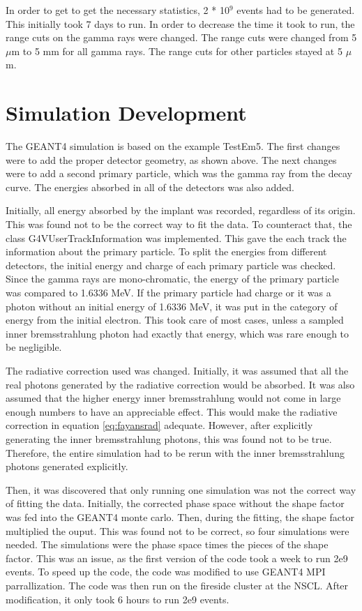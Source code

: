\documentclass[../main.tex]{subfiles}
\begin{document}
In order to get to get the necessary statistics, 2 * 10$^{9}$ events had to be generated. 
This initially took 7 days to run. 
In order to decrease the time it took to run, the range cuts on the gamma rays were changed.
The range cuts were changed from 5 $\mu$m to 5 mm for all gamma rays.
The range cuts for other particles stayed at 5 $\mu$m.

\section{Simulation Development}
The GEANT4 simulation is based on the example TestEm5.
The first changes were to add the proper detector geometry, as shown above.
The next changes were to add a second primary particle, which was the gamma ray from the decay curve.
The energies absorbed in all of the detectors was also added.

Initially, all energy absorbed by the implant was recorded, regardless of its origin.
This was found not to be the correct way to fit the data.
To counteract that, the class G4VUserTrackInformation was implemented.
This gave the each track the information about the primary particle.
To split the energies from different detectors, the initial energy and charge of each primary particle was checked.
Since the gamma rays are mono-chromatic, the energy of the primary particle was compared to 1.6336 MeV.
If the primary particle had charge or it was a photon without an initial energy of 1.6336 MeV, it was put in the category of energy from the initial electron. 
This took care of most cases, unless a sampled inner bremsstrahlung photon had exactly that energy, which was rare enough to be negligible.

The radiative correction used was changed.
Initially, it was assumed that all the real photons generated by the radiative correction would be absorbed.
It was also assumed that the higher energy inner bremsstrahlung would not come in large enough numbers to have an appreciable effect. 
This would make the radiative correction in equation \ref{eq:fayansrad} adequate. 
However, after explicitly generating the inner bremsstrahlung photons, this was found not to be true.
Therefore, the entire simulation had to be rerun with the inner bremsstrahlung photons generated explicitly.

Then, it was discovered that only running one simulation was not the correct way of fitting the data.
Initially, the corrected phase space without the shape factor was fed into the GEANT4 monte carlo.
Then, during the fitting, the shape factor multiplied the ouput. 
This was found not to be correct, so four simulations were needed.
The simulations were the phase space times the pieces of the shape factor.
This was an issue, as the first version of the code took a week to run 2e9 events.
To speed up the code, the code was modified to use GEANT4 MPI parrallization.
The code was then run on the fireside cluster at the NSCL.
After modification, it only took 6 hours to run 2e9 events.
\end{document}
